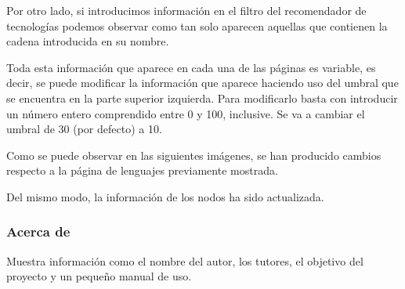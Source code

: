 \newpage
Por otro lado, si introducimos información en el filtro del recomendador de tecnologías podemos observar como tan solo aparecen aquellas que contienen la cadena introducida en su nombre.


Toda esta información que aparece en cada una de las páginas es variable, es decir, se puede modificar la información que aparece haciendo uso del umbral que se encuentra en la parte superior izquierda. Para modificarlo basta con introducir un número entero comprendido entre 0 y 100, inclusive. Se va a cambiar el umbral de 30 (por defecto) a 10.

\newpage
Como se puede observar en las siguientes imágenes, se han producido cambios respecto a la página de lenguajes previamente mostrada.


Del mismo modo, la información de los nodos ha sido actualizada.

\newpage
\subsubsection{Acerca de}
Muestra información como el nombre del autor, los tutores, el objetivo del proyecto y un pequeño manual de uso.
